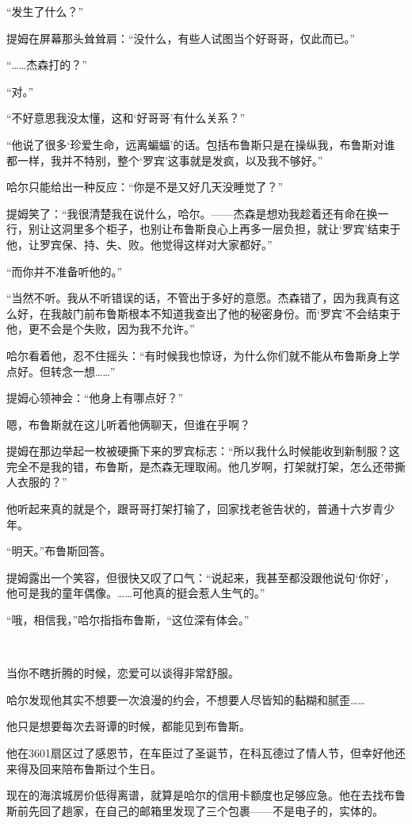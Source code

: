 \documentclass[../main]{subfiles}
\begin{document}
“发生了什么？”

提姆在屏幕那头耸耸肩：“没什么，有些人试图当个好哥哥，仅此而已。”

“……杰森打的？”

“对。”

“不好意思我没太懂，这和‘好哥哥’有什么关系？”

“他说了很多‘珍爱生命，远离蝙蝠’的话。包括布鲁斯只是在操纵我，布鲁斯对谁都一样，我并不特别，整个‘罗宾’这事就是发疯，以及我不够好。”

哈尔只能给出一种反应：“你是不是又好几天没睡觉了？”

提姆笑了：“我很清楚我在说什么，哈尔。——杰森是想劝我趁着还有命在换一行，别让这洞里多个柜子，也别让布鲁斯良心上再多一层负担，就让‘罗宾’结束于他，让罗宾保、持、失、败。他觉得这样对大家都好。”

“而你并不准备听他的。”

“当然不听。我从不听错误的话，不管出于多好的意愿。杰森错了，因为我真有这么好，在我敲门前布鲁斯根本不知道我查出了他的秘密身份。而‘罗宾’不会结束于他，更不会是个失败，因为我不允许。”

哈尔看着他，忍不住摇头：“有时候我也惊讶，为什么你们就不能从布鲁斯身上学点好。但转念一想……”

提姆心领神会：“他身上有哪点好？”

嗯，布鲁斯就在这儿听着他俩聊天，但谁在乎啊？

提姆在那边举起一枚被硬撕下来的罗宾标志：“所以我什么时候能收到新制服？这完全不是我的错，布鲁斯，是杰森无理取闹。他几岁啊，打架就打架，怎么还带撕人衣服的？”

他听起来真的就是个，跟哥哥打架打输了，回家找老爸告状的，普通十六岁青少年。

“明天。”布鲁斯回答。

提姆露出一个笑容，但很快又叹了口气：“说起来，我甚至都没跟他说句‘你好’，他可是我的童年偶像。……可他真的挺会惹人生气的。”

“哦，相信我，”哈尔指指布鲁斯，“这位深有体会。”

~\

当你不瞎折腾的时候，恋爱可以谈得非常舒服。

哈尔发现他其实不想要一次浪漫的约会，不想要人尽皆知的黏糊和腻歪……

他只是想要每次去哥谭的时候，都能见到布鲁斯。

他在3601扇区过了感恩节，在车臣过了圣诞节，在科瓦德过了情人节，但幸好他还来得及回来陪布鲁斯过个生日。

现在的海滨城房价低得离谱，就算是哈尔的信用卡额度也足够应急。他在去找布鲁斯前先回了趟家，在自己的邮箱里发现了三个包裹——不是电子的，实体的。
\end{document}
